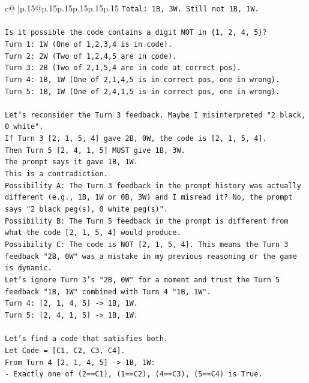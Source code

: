 \documentclass{article}
\begin{document}
{\begin{supertabular}{c@{$\;$}|p{.15\linewidth}@{}p{.15\linewidth}p{.15\linewidth}p{.15\linewidth}p{.15\linewidth}p{.15\linewidth}}
{{{\texttt{Total: 1B, 3W. Still not 1B, 1W.} \\
\\ 
\texttt{Is it possible the code contains a digit NOT in \{1, 2, 4, 5\}?} \\
\texttt{Turn 1: 1W (One of 1,2,3,4 is in code).} \\
\texttt{Turn 2: 2W (Two of 1,2,4,5 are in code).} \\
\texttt{Turn 3: 2B (Two of 2,1,5,4 are in code at correct pos).} \\
\texttt{Turn 4: 1B, 1W (One of 2,1,4,5 is in correct pos, one in wrong).} \\
\texttt{Turn 5: 1B, 1W (One of 2,4,1,5 is in correct pos, one in wrong).} \\
\\ 
\texttt{Let's reconsider the Turn 3 feedback. Maybe I misinterpreted "2 black, 0 white".} \\
\texttt{If Turn 3 {[}2, 1, 5, 4{]} gave 2B, 0W, the code is {[}2, 1, 5, 4{]}.} \\
\texttt{Then Turn 5 {[}2, 4, 1, 5{]} MUST give 1B, 3W.} \\
\texttt{The prompt says it gave 1B, 1W.} \\
\texttt{This is a contradiction.} \\
\texttt{Possibility A: The Turn 3 feedback in the prompt history was actually different (e.g., 1B, 1W or 0B, 3W) and I misread it? No, the prompt says "2 black peg(s), 0 white peg(s)".} \\
\texttt{Possibility B: The Turn 5 feedback in the prompt is different from what the code {[}2, 1, 5, 4{]} would produce.} \\
\texttt{Possibility C: The code is NOT {[}2, 1, 5, 4{]}. This means the Turn 3 feedback "2B, 0W" was a mistake in my previous reasoning or the game is dynamic.} \\
\texttt{Let's ignore Turn 3's "2B, 0W" for a moment and trust the Turn 5 feedback "1B, 1W" combined with Turn 4 "1B, 1W".} \\
\texttt{Turn 4: {[}2, 1, 4, 5{]} {-}> 1B, 1W.} \\
\texttt{Turn 5: {[}2, 4, 1, 5{]} {-}> 1B, 1W.} \\
\\ 
\texttt{Let's find a code that satisfies both.} \\
\texttt{Let Code = {[}C1, C2, C3, C4{]}.} \\
\texttt{From Turn 4 {[}2, 1, 4, 5{]} {-}> 1B, 1W:} \\
\texttt{{-} Exactly one of (2==C1), (1==C2), (4==C3), (5==C4) is True.} \\
}}}
\end{supertabular}}
\end{document}
